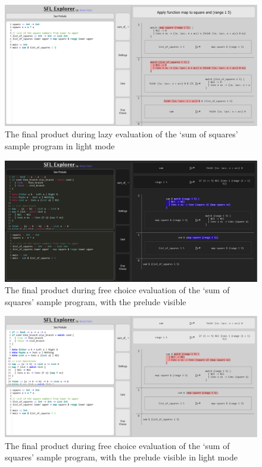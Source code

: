 \begin{figure}[h]
    \centering
    \includegraphics[width=\linewidth]{images/final_light.png} 
    \captionsetup{justification=centering}
    \caption{The final product during lazy evaluation of the `sum of squares' sample program in light mode}
    \label{fig:screenshot_final_light}
\end{figure}

\begin{figure}[h]
    \centering
    \includegraphics[width=\linewidth]{images/final_dark_prelude_free.png} 
    \captionsetup{justification=centering}
    \caption{The final product during free choice evaluation of the `sum of squares' sample program, with the prelude visible}
    \label{fig:screenshot_final_dark_prelude_free}
\end{figure}

\begin{figure}[h]
    \centering
    \includegraphics[width=\linewidth]{images/final_light_prelude_free.png} 
    \captionsetup{justification=centering}
    \caption{The final product during free choice evaluation of the `sum of squares' sample program, with the prelude visible in light mode}    
    \label{fig:screenshot_final_light_prelude_free}
\end{figure}

% 

